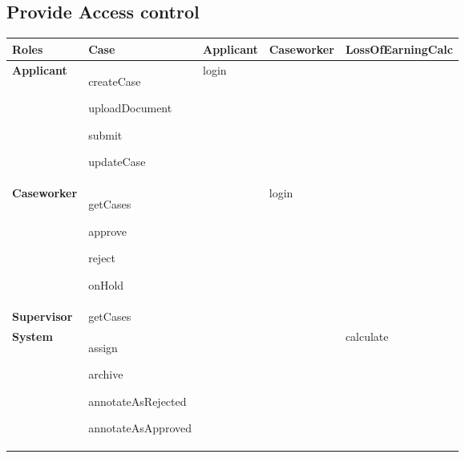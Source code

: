 \newpage
\subsection{Provide Access control}

\begin{table}[htb!]
\begin{tabularx}{\textwidth}{l|X|l|l|l}
	\textbf{Roles} & \textbf{Case} & \textbf{Applicant} & \textbf{Caseworker} & \textbf{LossOfEarningCalc}\\
	\hline
	\textbf{Applicant} & 
	\begin{compactitem}
	    \item createCase
	    \item uploadDocument
	    \item submit
	    \item updateCase
	\end{compactitem}  &  login & & \\
	\hline
	\textbf{Caseworker} & 
	\begin{compactitem} 
	    \item getCases
	    \item approve
	    \item reject
	    \item onHold
	\end{compactitem} & & login & \\
	\hline
	\textbf{Supervisor} & getCases & & & \\
	\hline
	\textbf{System} & 
	\begin{compactitem}
	    \item assign
	    \item archive
	    \item annotateAsRejected
	    \item annotateAsApproved
	\end{compactitem} & & & calculate\\
\end{tabularx}
\end{table}